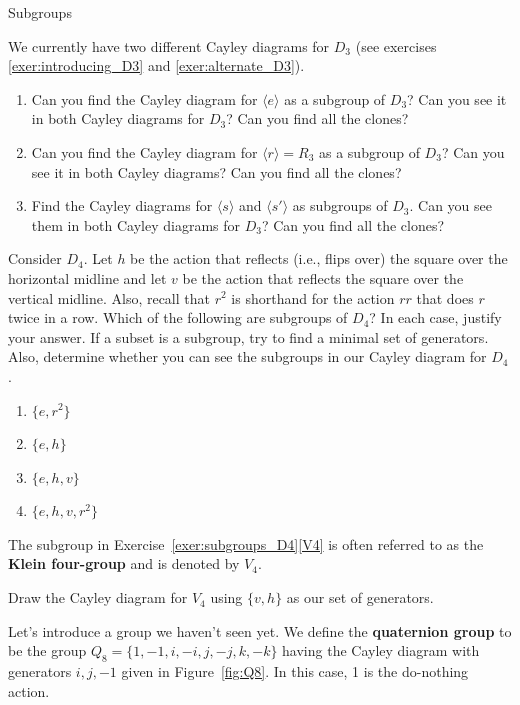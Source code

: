 \begin{section}{Subgroups}
\begin{exercise}
We currently have two different Cayley diagrams for $D_3$ (see exercises \ref{exer:introducing_D3} and \ref{exer:alternate_D3}).  
\begin{enumerate}[label=\rm{(\alph*)}]
\item Can you find the Cayley diagram for $\langle e\rangle$ as a subgroup of $D_3$?  Can you see it in both Cayley diagrams for $D_3$?  Can you find all the clones?
\item Can you find the Cayley diagram for $\langle r\rangle =R_3$ as a subgroup of $D_3$?  Can you see it in both Cayley diagrams?  Can you find all the clones?
\item Find the Cayley diagrams for $\langle s\rangle$ and $\langle s'\rangle$ as subgroups of $D_3$.  Can you see them in both Cayley diagrams for $D_3$?  Can you find all the clones?
\end{enumerate}
\end{exercise}

\begin{exercise}\label{exer:subgroups_D4}
Consider $D_4$.  Let $h$ be the action that reflects (i.e., flips over) the square over the horizontal midline and let $v$ be the action that reflects the square over the vertical midline.  Also, recall that $r^2$ is shorthand for the action $rr$ that does $r$ twice in a row.  Which of the following are subgroups of $D_4$?  In each case, justify your answer.  If a subset is a subgroup, try to find a minimal set of generators.  Also, determine whether you can see the subgroups in our Cayley diagram for $D_4$.
\begin{enumerate}[label=\rm{(\alph*)}]
\item $\{e, r^2\}$
\item $\{e,h\}$
\item $\{e, h, v\}$
\item\label{V4} $\{e, h, v, r^2\}$
\end{enumerate}
\end{exercise}

The subgroup in Exercise~\ref{exer:subgroups_D4}\ref{V4} is often referred to as the \textbf{Klein four-group} and is denoted by $V_4$.

\begin{exercise}
Draw the Cayley diagram for $V_4$ using $\{v,h\}$ as our set of generators.
\end{exercise}

Let's introduce a group we haven't seen yet.  We define the \textbf{quaternion group} to be the group $Q_8=\{1,-1,i,-i,j,-j,k,-k\}$ having the Cayley diagram with generators $i, j, -1$ given in Figure~\ref{fig:Q8}.  In this case, 1 is the do-nothing action.


\end{section}
